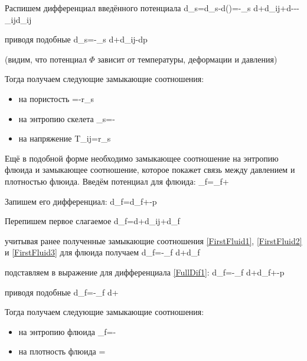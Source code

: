 \documentclass[main.tex]{subfiles}
\begin{document}
Распишем дифференциал введённого потенциала
\beq
d\Phi_s=d\tilde{\Psi}_s-d\left(\right)=-\eta_s d\theta+d\varepsilon_{ij}+d\varphi---\delta_{ij}d\varepsilon_{ij}
\eeq

приводя подобные
\beq
d\Phi_s=-\eta_s d\theta+d\varepsilon_{ij}-dp
\eeq

(видим, что потенциал $\Phi$ зависит от температуры, деформации и давления)

Тогда получаем следующие замыкающие соотношения:

\begin{itemize}
\item на пористость
\beq
\varphi=-r_s
\eeq

\item на энтропию скелета
\beq
\eta_s=-
\eeq

\item на напряжение
\beq
T_{ij}=r_s
\eeq
\end{itemize}

Ещё в подобной форме необходимо замыкающее соотношение на энтропию флюида и замыкающее соотношение, которое покажет связь между давлением и плотностью флюида.
Введём потенциал для флюида:
\beq
\Phi_f=\Psi_f+
\eeq

Запишем его дифференциал:
\beq\label{FullDif1}
d\Phi_f=d\Psi_f+-p
\eeq

Перепишем первое слагаемое
\beq
d\Psi_f=d\theta+d\varepsilon_{ij}+d\rho_f
\eeq

учитывая ранее полученные замыкающие соотношения \eqref{FirstFluid1}, \eqref{FirstFluid2} и \eqref{FirstFluid3} для флюида получаем
\beq
d\Psi_f=-\eta_f d\theta+d\rho_f
\eeq

подставляем в выражение для дифференциала \eqref{FullDif1}:
\beq
d\Phi_f=-\eta_f d\theta+d\rho_f+-p
\eeq

приводя подобные
\beq
d\Phi_f=-\eta_f d\theta+
\eeq

Тогда получаем следующие замыкающие соотношения:

\begin{itemize}
\item на энтропию флюида
\beq
\eta_f=-
\eeq

\item на плотность флюида
\beq
{}=
\eeq
\end{itemize}
\end{document}
